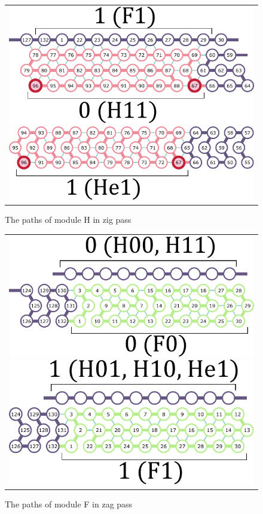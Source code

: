\documentclass[runningheads]{llncs}
\begin{document}
\begin{figure}[h]
\begin{tabular}{c}
 \begin{minipage}{0.33\linewidth}
  \centering
   \includegraphics[width=0.9\linewidth]{fig/svg/H11_1.pdf}
 \end{minipage}
 
  \begin{minipage}{0.33\linewidth}
  \centering
   \includegraphics[width=0.9\linewidth]{fig/svg/He1_1.pdf}

 \end{minipage}
 \end{tabular}
 \caption{The paths of module H in zig pass}
 \label{fig:halfadders}
\end{figure}

\begin{figure}[h]
\begin{tabular}{c}
 \begin{minipage}{0.5\linewidth}
  \centering
   \includegraphics[width=0.6\linewidth]{fig/svg/F0_1.pdf}
 \end{minipage}
 
 \begin{minipage}{0.5\linewidth}
  \centering
   \includegraphics[width=0.6\linewidth]{fig/svg/F1_1.pdf}

 \end{minipage}
 \end{tabular}
 \caption{The paths of module F in zag pass}
 \label{fig:formatters}
\end{figure}
\end{document}
